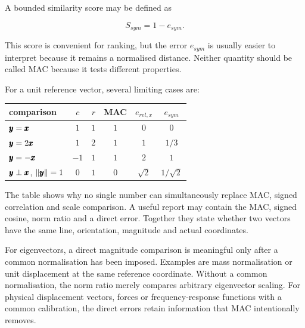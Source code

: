 A bounded similarity score may be defined as

\begin{equation}
    S_{sym}=1-e_{sym}.
\end{equation}

This score is convenient for ranking, but the error $e_{sym}$ is usually easier
to interpret because it remains a normalised distance. Neither quantity should
be called MAC because it tests different properties.

For a unit reference vector, several limiting cases are:

\begin{center}
\small
\begin{tabular}{lccccc}
    comparison & $c$ & $r$ & MAC & $e_{rel,x}$ & $e_{sym}$ \\
    \hline
    $\pmb{y}=\pmb{x}$ & $1$ & $1$ & $1$ & $0$ & $0$ \\
    $\pmb{y}=2\pmb{x}$ & $1$ & $2$ & $1$ & $1$ & $1/3$ \\
    $\pmb{y}=-\pmb{x}$ & $-1$ & $1$ & $1$ & $2$ & $1$ \\
    $\pmb{y}\perp\pmb{x}$, $\| {\pmb{y}} \|=1$
        & $0$ & $1$ & $0$ & $\sqrt{2}$ & $1/\sqrt{2}$ \\
\end{tabular}
\end{center}

The table shows why no single number can simultaneously replace MAC, signed
correlation and scale comparison. A useful report may contain the MAC, signed
cosine, norm ratio and a direct error. Together they state whether two vectors
have the same line, orientation, magnitude and actual coordinates.

For eigenvectors, a direct magnitude comparison is meaningful only after a
common normalisation has been imposed. Examples are mass normalisation or unit
displacement at the same reference coordinate. Without a common
normalisation, the norm ratio merely compares arbitrary eigenvector scaling. For
physical displacement vectors, forces or frequency-response functions with a
common calibration, the direct errors retain information that MAC intentionally
removes.

